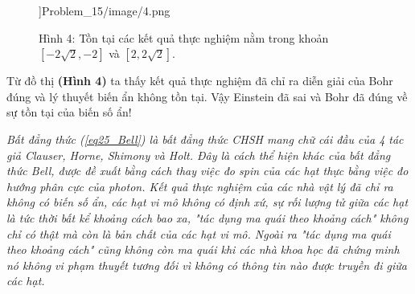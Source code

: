 \begin{enumerate}
\begin{enumerate}[label=\textbf{\alph*,}]
\begin{center}
\begin{figure}[htp]
\begin{center}
        ]{Problem_15/image/4.png}
    \end{center}
    \begin{center}
        Hình 4: Tồn tại các kết quả thực nghiệm nằm trong khoản $[-2\sqrt{2},-2]$ và $[2,2\sqrt{2}]$.
    \end{center}
    \end{figure}
\end{center}
Từ đồ thị \textbf{(Hình 4)} ta thấy kết quả thực nghiệm đã chỉ ra diễn giải của Bohr đúng và lý thuyết biến ẩn không tồn tại. Vậy Einstein đã sai và Bohr đã đúng về sự tồn tại của biến số ẩn!
     \end{enumerate}
     \textit{Bất đẳng thức (\ref{eq25_Bell}) là bất đẳng thức CHSH mang chữ cái đầu của 4 tác giả Clauser, Horne, Shimony và Holt. Đây là cách thể hiện khác của bất đẳng thức Bell, được đề xuất bằng cách thay việc đo spin của các hạt thực bằng việc đo hướng phân cực của photon. Kết quả thực nghiệm của các nhà vật lý đã chỉ ra không có biến số ẩn, các hạt vi mô không có định xứ, sự rối lượng tử giữa các hạt là tức thời bất kể khoảng cách bao xa, "tác dụng ma quái theo khoảng cách" không chỉ có thật mà còn là bản chất của các hạt vi mô. Ngoài ra "tác dụng ma quái theo khoảng cách" cũng không còn ma quái khi các nhà khoa học đã chứng minh nó không vi phạm thuyết tương đối vì không có thông tin nào được truyền đi giữa các hạt.}
    \end{enumerate}

